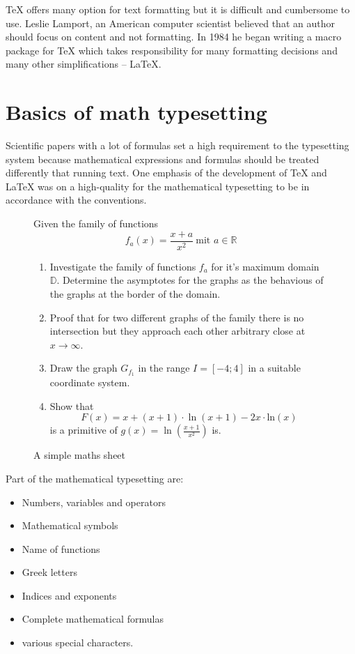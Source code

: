 \documentclass[11pt, a4paper]{article}
\newcommand{\ltx}{\LaTeX}
\begin{document}
\TeX{} offers many option for text formatting but it is difficult and cumbersome to use. Leslie Lamport, an American computer scientist believed that an author should focus on content and not formatting. In 1984 he began writing a macro package for \TeX{} which takes responsibility for many formatting decisions and many other simplifications -- \ltx.

\section{Basics of math typesetting}

Scientific papers with a lot of formulas set a high requirement to the typesetting system because mathematical expressions and formulas should be treated differently that running text. One emphasis of the development of \TeX{} and \ltx{} was on a high-quality for the mathematical typesetting to be in accordance with the conventions.

\begingroup
{}
\begin{figure}[p!] %
Given the family of functions
\begin{displaymath}
f_a(x) = \frac{x+a}{x^2}~\mbox{mit } a \in \mathbb{R}
\end{displaymath}
\begin{enumerate}
\item Investigate the family of functions \( f_a\) for it's maximum domain \(\mathbb{D}\). Determine the asymptotes for the graphs as the behavious of the graphs at the border of the domain.
\item Proof that for two different graphs of the family there is no intersection but they approach each other arbitrary close at \(x\to\infty\).
\item Draw the graph \(G_{f_1}\) in the range \(I = \left[-4;4\right]\) in a suitable coordinate system.
\item Show that
\begin{displaymath}
F(x) = x +(x+1)\cdot\ln(x+1) - 2x\cdot\mbox{ln}(x)
\end{displaymath}
is a primitive of \(\displaystyle g(x) = \ln\left(\frac{x+1}{x^2}\right)\) is.
\end{enumerate}
\caption{A simple maths sheet}
\label{fig:formeln}
\end{figure}
\endgroup

Part of the mathematical typesetting are:
\begin{itemize}
\item Numbers, variables and operators
\item Mathematical symbols
\item Name of functions
\item Greek letters
\item Indices and exponents
\item Complete mathematical formulas
\item various special characters.
\end{itemize}
\end{document}
